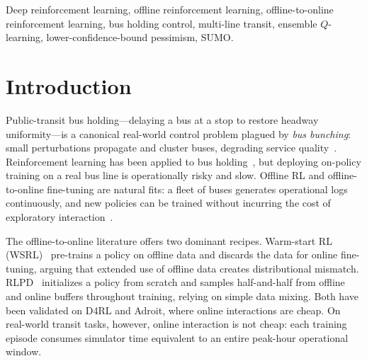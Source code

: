 \documentclass[journal,10pt]{IEEEtran}
\begin{document}
\begin{IEEEkeywords}
Deep reinforcement learning, offline reinforcement learning, offline-to-online reinforcement learning, bus holding control, multi-line transit, ensemble $Q$-learning, lower-confidence-bound pessimism, SUMO.
\end{IEEEkeywords}

\section{Introduction}
\label{sec:intro}

Public-transit bus holding---delaying a bus at a stop to restore headway uniformity---is a canonical real-world control problem plagued by \textit{bus bunching}: small perturbations propagate and cluster buses, degrading service quality~\cite{daganzo2009headway,bartholdi2012self}. Reinforcement learning has been applied to bus holding~\cite{alesiani2018reinforcement,wang2020holding}, but deploying on-policy training on a real bus line is operationally risky and slow. Offline RL and offline-to-online fine-tuning are natural fits: a fleet of buses generates operational logs continuously, and new policies can be trained without incurring the cost of exploratory interaction~\cite{levine2020offline}.

The offline-to-online literature offers two dominant recipes. Warm-start RL (WSRL)~\cite{zhou2024efficient} pre-trains a policy on offline data and discards the data for online fine-tuning, arguing that extended use of offline data creates distributional mismatch. RLPD~\cite{ball2023efficient} initializes a policy from scratch and samples half-and-half from offline and online buffers throughout training, relying on simple data mixing. Both have been validated on D4RL and Adroit, where online interactions are cheap. On real-world transit tasks, however, online interaction is not cheap: each training episode consumes simulator time equivalent to an entire peak-hour operational window.
\end{document}
